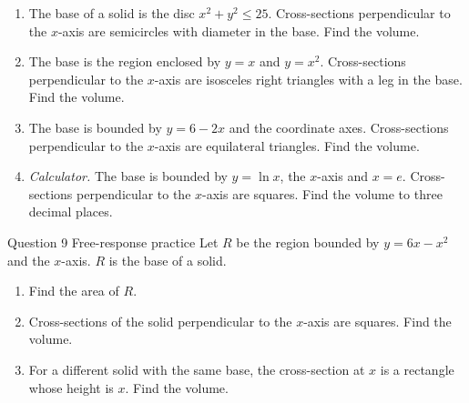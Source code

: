 \documentclass[11pt]{article}
\begin{document}
\begin{enumerate}[leftmargin=*,itemsep=2pt,start=5]
  \item The base of a solid is the disc $x^2+y^2\le25$. Cross-sections perpendicular to the $x$-axis are semicircles with diameter in the base. Find the volume.\work{2.8cm}
  \item The base is the region enclosed by $y=x$ and $y=x^2$. Cross-sections perpendicular to the $x$-axis are isosceles right triangles with a leg in the base. Find the volume.\work{2.8cm}
  \item The base is bounded by $y=6-2x$ and the coordinate axes. Cross-sections perpendicular to the $x$-axis are equilateral triangles. Find the volume.\work{2.8cm}
  \item \emph{Calculator.} The base is bounded by $y=\ln x$, the $x$-axis and $x=e$. Cross-sections perpendicular to the $x$-axis are squares. Find the volume to three decimal places.\work{2.8cm}
\end{enumerate}

\begin{frbox}{Question 9 \textperiodcentered{} Free-response practice}
Let $R$ be the region bounded by $y=6x-x^2$ and the $x$-axis. $R$ is the base of a solid.
\begin{enumerate}[label=(\alph*),leftmargin=*,itemsep=2pt]
  \item Find the area of $R$.\work{2.6cm}
  \item Cross-sections of the solid perpendicular to the $x$-axis are squares. Find the volume.\work{2.6cm}
  \item For a different solid with the same base, the cross-section at $x$ is a rectangle whose height is $x$. Find the volume.\work{2.6cm}
\end{enumerate}
\end{frbox}
\end{document}

